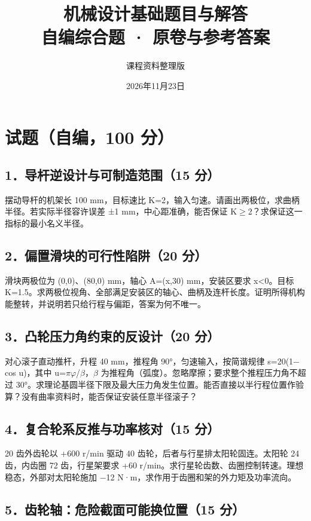 \documentclass[zihao=5,a4paper,UTF8,fontset=fandol]{ctexart}
\title{\textbf{机械设计基础题目与解答}\\[.4em]\large 自编综合题 · 原卷与参考答案}
\author{课程资料整理版}
\date{2026年11月23日}
\begin{document}
\maketitle
\tableofcontents
\clearpage

\section{试题（自编，100 分）}

\subsection{1．导杆逆设计与可制造范围（15 分）}

摆动导杆的机架长 100 mm，目标速比 K=2，输入匀速。请画出两极位，求曲柄半径。若实际半径容许误差 ±1 mm，中心距准确，能否保证 K$\ge$2？求保证这一指标的最小名义半径。


\subsection{2．偏置滑块的可行性陷阱（20 分）}

滑块两极位为 (0,0)、(80,0) mm，轴心 A=(x,30) mm，安装区要求 x<0。目标 K=1.5。求两极位视角、全部满足安装区的轴心、曲柄及连杆长度。证明所得机构能整转，并说明若只给行程与偏距，答案为何不唯一。


\subsection{3．凸轮压力角约束的反设计（20 分）}

对心滚子直动推杆，升程 40 mm，推程角 90°，匀速输入，按简谐规律 s=20(1$-$cos u)，其中 u=$\pi$$\varphi$/$\beta$，$\beta$ 为推程角（弧度）。忽略摩擦；要求整个推程压力角不超过 30°。求理论基圆半径下限及最大压力角发生位置。能否直接以半行程位置作验算？没有曲率资料时，能否保证安装任意半径滚子？


\subsection{4．复合轮系反推与功率核对（15 分）}

20 齿外齿轮以 +600 r/min 驱动 40 齿轮，后者与行星排太阳轮固连。太阳轮 24 齿，内齿圈 72 齿，行星架要求 +60 r/min。求行星轮齿数、齿圈控制转速。理想稳态，外部对太阳轮施加 $-$12 N·m，求作用于齿圈和架的外力矩及功率流向。


\subsection{5．齿轮轴：危险截面可能换位置（15 分）}
\end{document}
